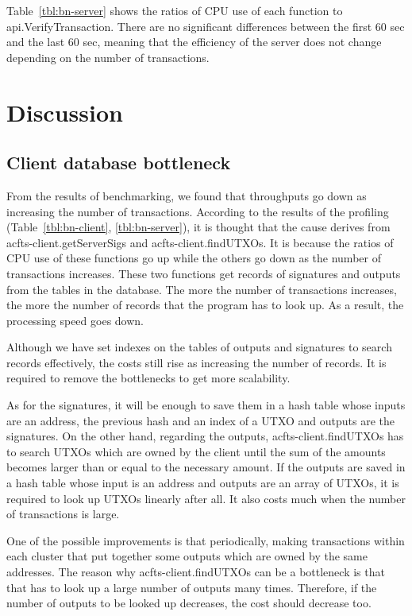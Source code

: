\documentclass[a4paper, oneside]{discothesis}
\begin{document}
Table~\ref{tbl:bn-server} shows the ratios of CPU use of each function to api.VerifyTransaction.
There are no significant differences between the first 60 sec and the last 60 sec,
meaning that the efficiency of the server does not change
depending on the number of transactions.

\section{Discussion}

\subsection{Client database bottleneck}
From the results of benchmarking, we found that throughputs go down
as increasing the number of transactions.
According to the results of the profiling (Table~\ref{tbl:bn-client}, \ref{tbl:bn-server}),
it is thought that the cause derives from acfts-client.getServerSigs and acfts-client.findUTXOs.
It is because the ratios of CPU use of these functions go up
while the others go down as the number of transactions increases.
These two functions get records of signatures and outputs from the tables in the database.
The more the number of transactions increases,
the more the number of records that the program has to look up.
As a result, the processing speed goes down.

Although we have set indexes on the tables of outputs and signatures
to search records effectively, the costs still rise as increasing the number of records.
It is required to remove the bottlenecks to get more scalability.

As for the signatures, it will be enough to save them in a hash table whose inputs are
an address, the previous hash and an index of a UTXO and outputs are the signatures.
On the other hand, regarding the outputs, acfts-client.findUTXOs has to search UTXOs
which are owned by the client until the sum of the amounts becomes larger than or equal to
the necessary amount.
If the outputs are saved in a hash table whose input is an address and outputs are
an array of UTXOs, it is required to look up UTXOs linearly after all.
It also costs much when the number of transactions is large.

One of the possible improvements is that periodically, making transactions
within each cluster that put together some outputs which are owned by the same addresses.
The reason why acfts-client.findUTXOs can be a bottleneck is that that has to
look up a large number of outputs many times.
Therefore, if the number of outputs to be looked up decreases, the cost should decrease too.
\end{document}
